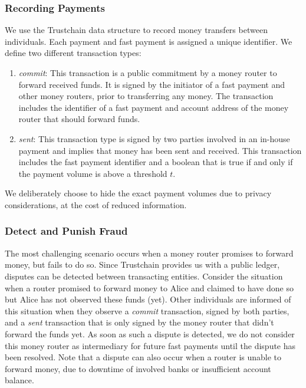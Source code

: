 \subsubsection*{Recording Payments}
We use the Trustchain data structure to record money transfers between individuals.
Each payment and fast payment is assigned a unique identifier.
We define two different transaction types:
\begin{enumerate}
	\item \emph{commit}: This transaction is a public commitment by a money router to forward received funds.
	It is signed by the initiator of a fast payment and other money routers, prior to transferring any money. The transaction includes the identifier of a fast payment and account address of the money router that should forward funds.
	\item \emph{sent}: This transaction type is signed by two parties involved in an in-house payment and implies that money has been sent and received. This transaction includes the fast payment identifier and a boolean that is true if and only if the payment volume is above a threshold $ t $. 
\end{enumerate}
We deliberately choose to hide the exact payment volumes due to privacy considerations, at the cost of reduced information.

\subsubsection*{Detect and Punish Fraud}
The most challenging scenario occurs when a money router promises to forward money, but fails to do so.
Since Trustchain provides us with a public ledger, disputes can be detected between transacting entities.
Consider the situation when a router promised to forward money to Alice and claimed to have done so but Alice has not observed these funds (yet).
Other individuals are informed of this situation when they observe a \emph{commit} transaction, signed by both parties, and a \emph{sent} transaction that is only signed by the money router that didn't forward the funds yet.
As soon as such a dispute is detected, we do not consider this money router as intermediary for future fast payments until the dispute has been resolved.
Note that a dispute can also occur when a router is unable to forward money, due to downtime of involved banks or insufficient account balance.

